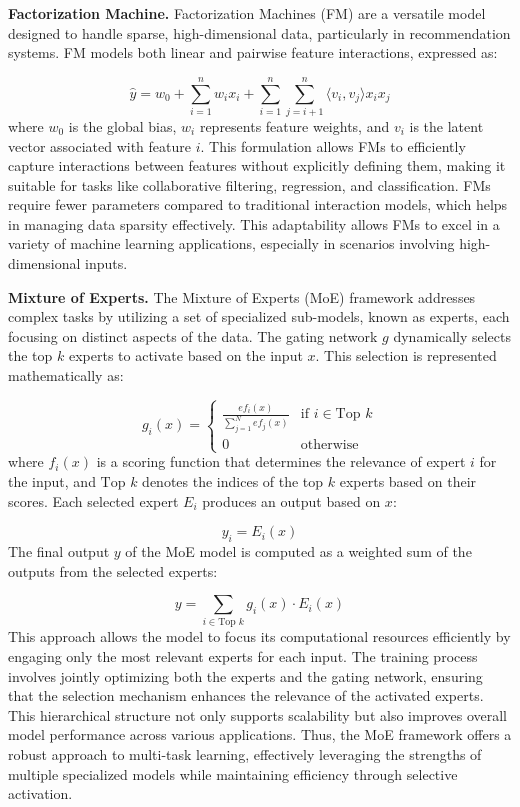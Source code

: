 \documentclass[preprint,12pt]{elsarticle}
\begin{document}
\noindent\textbf{Factorization Machine.} Factorization Machines (FM) are a versatile model designed to handle sparse, high-dimensional data, particularly in recommendation systems. FM models both linear and pairwise feature interactions, expressed as:

\[
\hat{y} = w_0 + \sum_{i=1}^{n} w_i x_i + \sum_{i=1}^{n} \sum_{j=i+1}^{n} \langle v_i, v_j \rangle x_i x_j
\] where $w_0$ is the global bias, $w_i$ represents feature weights, and $v_i$ is the latent vector associated with feature $i$. This formulation allows FMs to efficiently capture interactions between features without explicitly defining them, making it suitable for tasks like collaborative filtering, regression, and classification. FMs require fewer parameters compared to traditional interaction models, which helps in managing data sparsity effectively. This adaptability allows FMs to excel in a variety of machine learning applications, especially in scenarios involving high-dimensional inputs.

\noindent\textbf{Mixture of Experts.} The Mixture of Experts (MoE) framework addresses complex tasks by utilizing a set of specialized sub-models, known as experts, each focusing on distinct aspects of the data. The gating network $g$ dynamically selects the top $k$ experts to activate based on the input $x$. This selection is represented mathematically as:

\[
g_i(x) = 
\begin{cases} 
\frac{ef_i(x)}{\sum_{j=1}^{N} ef_j(x)} & \text{if } i \in \text{Top } k \\ 
0 & \text{otherwise}
\end{cases}
\]where $f_i(x)$ is a scoring function that determines the relevance of expert $i$ for the input, and $\text{Top } k$ denotes the indices of the top $k$ experts based on their scores.
Each selected expert $E_i$ produces an output based on $x$:

\[
y_i = E_i(x)
\]The final output $y$ of the MoE model is computed as a weighted sum of the outputs from the selected experts:

\[
y = \sum_{i \in \text{Top } k} g_i(x) \cdot E_i(x)
\]This approach allows the model to focus its computational resources efficiently by engaging only the most relevant experts for each input. The training process involves jointly optimizing both the experts and the gating network, ensuring that the selection mechanism enhances the relevance of the activated experts. This hierarchical structure not only supports scalability but also improves overall model performance across various applications. Thus, the MoE framework offers a robust approach to multi-task learning, effectively leveraging the strengths of multiple specialized models while maintaining efficiency through selective activation.
\end{document}
